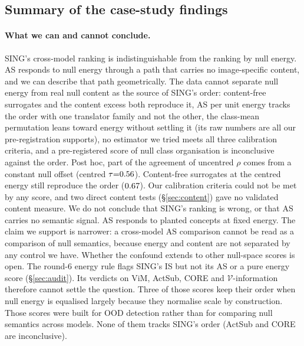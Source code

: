 \documentclass[10pt]{article}
\begin{document}
\subsection{Summary of the case-study findings}
\label{app:summary}
\paragraph{What we can and cannot conclude.}
SING's cross-model ranking is indistinguishable from the ranking by null energy.
AS responds to null energy through a path that carries no image-specific content, and we can describe that path geometrically.
The data cannot separate null energy from real null content as the source of SING's order: content-free surrogates and the content excess both reproduce it, AS per unit energy tracks the order with one translator family and not the other, the class-mean permutation leans toward energy without settling it (its raw numbers are all our pre-registration supports), no estimator we tried meets all three calibration criteria, and a pre-registered score of null class organisation is inconclusive against the order. Post hoc, part of the agreement of uncentred $\rho$ comes from a constant null offset (centred $\tau{=}0.56$). Content-free surrogates at the centred energy still reproduce the order ($0.67$). Our calibration criteria could not be met by any score, and two direct content tests (\S\ref{sec:content}) gave no validated content measure.
We do not conclude that SING's ranking is wrong, or that AS carries no semantic signal. AS responds to planted concepts at fixed energy.
The claim we support is narrower: a cross-model AS comparison cannot be read as a comparison of null semantics, because energy and content are not separated by any control we have.
Whether the confound extends to other null-space scores is open. The round-6 energy rule flags SING's IS but not its AS or a pure energy score (\S\ref{sec:audit}). Its verdicts on ViM, ActSub, CORE and $\mathcal{V}$-information therefore cannot settle the question. Three of those scores keep their order when null energy is equalised largely because they normalise scale by construction. Those scores were built for OOD detection rather than for comparing null semantics across models. None of them tracks SING's order (ActSub and CORE are inconclusive).
\end{document}
